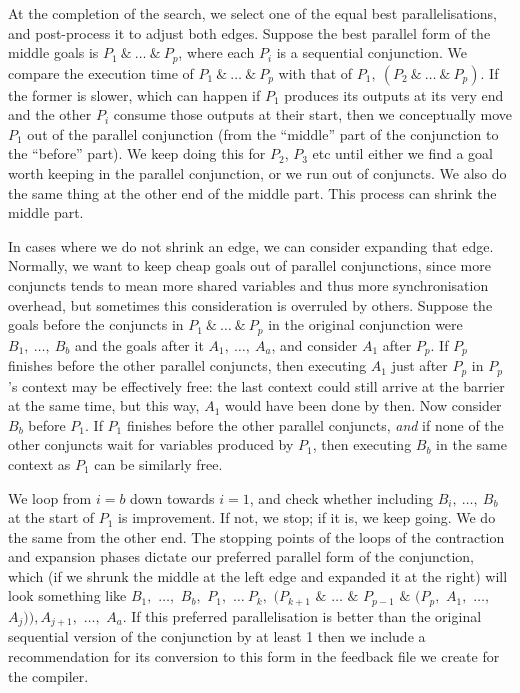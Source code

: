 \noindent
At the completion of the search,
we select one of the equal best parallelisations,
and post-process it to adjust both edges.
Suppose the best parallel form of the middle goals is $P_1~\&~\ldots~\&~P_p$,
where each $P_i$ is a sequential conjunction.
We compare the execution time of $P_1~\&~\ldots~\&~P_p$
with that of $P_1,~(P_2~\&~\ldots~\&~P_p)$.
If the former is slower,
which can happen if $P_1$ produces its outputs at its very end
and the other $P_i$ consume those outputs at their start,
then we conceptually move $P_1$ out of the parallel conjunction
(from the ``middle'' part of the conjunction to the ``before'' part).
We keep doing this for $P_2$, $P_3$ etc until either
we find a goal worth keeping in the parallel conjunction,
or we run out of conjuncts.
We also do the same thing at the other end of the middle part.
This process can shrink the middle part.

In cases where we do not shrink an edge, we can consider expanding that edge.
Normally, we want to keep cheap goals out of parallel conjunctions,
since more conjuncts tends to mean
more shared variables and thus more synchronisation overhead,
but sometimes this consideration is overruled by others.
Suppose the goals before the conjuncts in $P_1~\&~\ldots~\&~P_p$
in the original conjunction were $B_1,~\ldots,~B_b$
and the goals after it $A_1,~\ldots,~A_a$,
and consider $A_1$ after $P_p$.
If $P_p$ finishes before the other parallel conjuncts,
then executing $A_1$ just after $P_p$ in $P_p$'s context
may be effectively free:
the last context could still arrive at the barrier at the same time,
but this way, $A_1$ would have been done by then.
Now consider $B_b$ before $P_1$.
If $P_1$ finishes before the other parallel conjuncts,
\emph{and} if none of the other conjuncts wait for variables produced by $P_1$,
then executing $B_b$ in the same context as $P_1$ can be similarly free.

We loop from $i=b$ down towards $i=1$, and check whether
including $B_i,~\ldots,~B_b$ at the start of $P_1$ is improvement.
If not, we stop; if it is, we keep going.
We do the same from the other end.
The stopping points of the loops of the contraction and expansion phases
dictate our preferred parallel form of the conjunction, which
(if we shrunk the middle at the left edge and expanded it at the right)
will look something like
$B_1,$ $\ldots,$ $B_{b},$ $P_1,$ $\ldots~P_k,$
$(P_{k+1}$ $\&$ $\ldots$ $\&$ $P_{p-1}$ $\&$ $(P_p,$ $A_1,$ $\ldots,$ $A_j)),
A_{j+1},$ $\ldots,$ $A_a$.
If this preferred parallelisation is better than
the original sequential version of the conjunction by at least 1%
then we include a recommendation for its conversion to this form
in the feedback file we create for the compiler.

